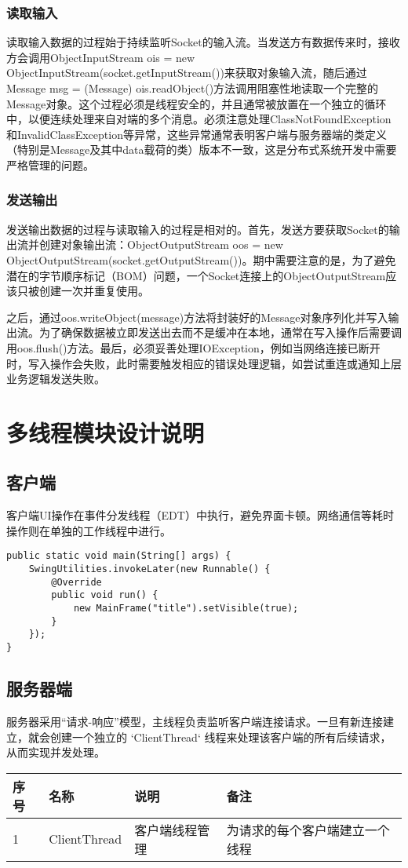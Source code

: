 \documentclass[a4paper]{ctexart}
\begin{document}
\subsubsection{读取输入}
读取输入数据的过程始于持续监听Socket的输入流。当发送方有数据传来时，接收方会调用ObjectInputStream ois = new ObjectInputStream(socket.getInputStream())来获取对象输入流，随后通过Message msg = (Message) ois.readObject()方法调用阻塞性地读取一个完整的Message对象。这个过程必须是线程安全的，并且通常被放置在一个独立的循环中，以便连续处理来自对端的多个消息。必须注意处理ClassNotFoundException和InvalidClassException等异常，这些异常通常表明客户端与服务器端的类定义（特别是Message及其中data载荷的类）版本不一致，这是分布式系统开发中需要严格管理的问题。

\subsubsection{发送输出}
发送输出数据的过程与读取输入的过程是相对的。首先，发送方要获取Socket的输出流并创建对象输出流：ObjectOutputStream oos = new ObjectOutputStream(socket.getOutputStream())。期中需要注意的是，为了避免潜在的字节顺序标记（BOM）问题，一个Socket连接上的ObjectOutputStream应该只被创建一次并重复使用。

之后，通过oos.writeObject(message)方法将封装好的Message对象序列化并写入输出流。为了确保数据被立即发送出去而不是缓冲在本地，通常在写入操作后需要调用oos.flush()方法。最后，必须妥善处理IOException，例如当网络连接已断开时，写入操作会失败，此时需要触发相应的错误处理逻辑，如尝试重连或通知上层业务逻辑发送失败。

\section{多线程模块设计说明}
\subsection{客户端}
客户端UI操作在事件分发线程（EDT）中执行，避免界面卡顿。网络通信等耗时操作则在单独的工作线程中进行。
\begin{lstlisting}
public static void main(String[] args) {
    SwingUtilities.invokeLater(new Runnable() {
        @Override
        public void run() {
            new MainFrame("title").setVisible(true);
        }
    });
}
\end{lstlisting}

\subsection{服务器端}
服务器采用“请求-响应”模型，主线程负责监听客户端连接请求。一旦有新连接建立，就会创建一个独立的 `ClientThread` 线程来处理该客户端的所有后续请求，从而实现并发处理。

\begin{tabular}{llll}
    \toprule
    \textbf{序号} & \textbf{名称}  & \textbf{说明} & \textbf{备注}     \\
    \midrule
    1           & ClientThread & 客户端线程管理     & 为请求的每个客户端建立一个线程 \\
    \bottomrule
\end{tabular}
\end{document}
